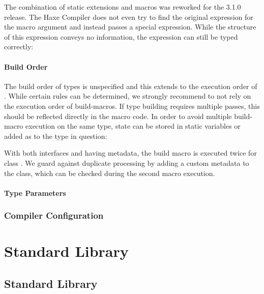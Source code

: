 \documentclass{haxe}
\begin{document}

The combination of static extensions and macros was reworked for the 3.1.0 release. The Haxe Compiler does not even try to find the original expression for the macro argument and instead passes a special  expression. While the structure of this expression conveys no information, the expression can still be typed correctly:




\subsection{Build Order}
\label{macro-limitations-build-order}

The build order of types is unspecified and this extends to the execution order of . While certain rules can be determined, we strongly recommend to not rely on the execution order of build-macros. If type building requires multiple passes, this should be reflected directly in the macro code. In order to avoid multiple build-macro execution on the same type, state can be stored in static variables or added as  to the type in question:


With both interfaces  and  having  metadata, the build macro is executed twice for class . We guard against duplicate processing by adding a custom  metadata to the class, which can be checked during the second macro execution.


\subsection{Type Parameters}
\label{macro-limitations-type-parameters}


\section{Compiler Configuration}
\label{macro-compiler-configuration}




\part{Standard Library}

\chapter{Standard Library}
\label{std}
\end{document}
